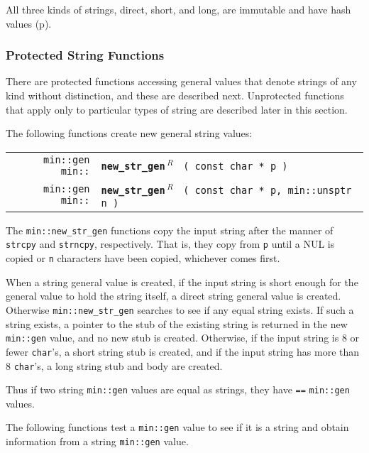 \documentclass[12pt]{article}
\makeatletter
\newcommand{\ttindex}[1]{\index{#1@{\tt #1}}}
\newcommand{\minindex}[1]{\ttindex{min::#1}\ttindex{#1}}
\newcommand{\pagref}[1]{p\pageref{#1}}
\newenvironment{indpar}[1][0.3in]%
	{\begin{list}{}%
		     {\setlength{\itemsep}{0in}%
		      \setlength{\topsep}{0in}%
		      \setlength{\parsep}{1ex}%
		      \setlength{\labelwidth}{#1}%
		      \setlength{\leftmargin}{#1}%
		      \addtolength{\leftmargin}{\labelsep}}%
	 \item}%
	{\end{list}}
\newcommand{\LABEL}[1]{\label{#1}}
\newcommand{\MINKEY}[1]{{\tt \bf #1}\minindex{#1}}
\newcommand{\REL}{$\,^R$}
\makeatother
\begin{document}
All three kinds of strings, direct, short, and long, are immutable
and have hash values (\pagref{HASH-VALUE}).

\subsubsection{Protected String Functions}
\label{PROTECTED-STRING-FUNCTIONS}

There are protected functions accessing general values that denote
strings of any kind without distinction, and these are described next.
Unprotected functions that apply only to particular
types of string are described later in this section.

The following functions create new general string values:

\begin{indpar}\begin{tabular}{r@{}l}
\verb|min::gen min::|
    & \MINKEY{new\_str\_gen\REL} \verb| ( const char * p )|
\LABEL{MIN::NEW_STR_GEN} \\
\verb|min::gen min::|
    & \MINKEY{new\_str\_gen\REL} \verb| ( const char * p, min::unsptr n )|
\LABEL{MIN::NEW_STR_GEN_WITH_N} \\
\end{tabular}\end{indpar}

The \verb|min::new_str_gen| functions copy the input string after the
manner of \verb|strcpy| and \verb|strncpy|, respectively.  That is,
they copy from \verb|p|
until a NUL is copied or \verb|n| characters have been copied, whichever
comes first.

When a string general value
is created, if the input string is short enough for the general value
to hold the string itself, a direct string general value is created.
Otherwise \verb|min::new_str_gen| searches to see if any equal string
exists.  If such a string exists, a pointer to the stub of the existing
string is returned in the new \verb|min::gen| value, and no new stub
is created.  Otherwise, if the input string is 8 or fewer {\tt char}'s,
a short string stub is created, and if the input string has more
than 8 {\tt char}'s, a long string stub and body are created.

Thus if two string \verb|min::gen| values are equal as
strings, they have \verb|==| \verb|min::gen| values.

The following functions test a \verb|min::gen| value to see if it
is a string and obtain information from
a string \verb|min::gen| value.
\end{document}
